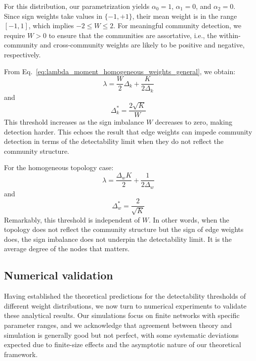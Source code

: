 \documentclass[a4paper,pre,superscriptaddress,floatfix,nofootinbib,twocolumn]{revtex4-1}
\begin{document}
For this distribution,
our parametrization yields $\alpha_0 = 1$, $\alpha_1 = 0$, and $\alpha_2 = 0$. Since sign weights take values in $\{-1, +1\}$, their mean weight
is in the range $[-1,1]$,
which implies $-2 \leq W \leq 2$. For meaningful community detection, we require $W > 0$ to ensure that the communities are assortative, i.e., the within-community and cross-community weights are likely to be positive and negative, respectively.


From Eq.~\eqref{eq:lambda_moment_homogeneous_weights_general}, we obtain:
\begin{equation}
\lambda = \frac{W}{2} \Delta_k + \frac{K}{2\Delta_k}
\label{eq:lambda_sign}
\end{equation}
and
\begin{equation}
\Delta_k^* = \frac{2\sqrt{K}}{W}
\label{eq:sign_det}
\end{equation}
This threshold increases as the sign imbalance $W$ decreases to zero, making detection harder. This echoes the result that edge weights can impede community detection  in terms of the detectability limit when they do not reflect the community structure.

For the homogeneous topology case:
\begin{equation}
\lambda = \frac{\Delta_w K}{2} + \frac{1}{2 \Delta_w}
\label{eq:lambda_sign_w}
\end{equation}
and
\begin{equation}
\Delta_{w}^* = \frac{2}{\sqrt{K}}
\label{eq:sign_w_det}
\end{equation}
Remarkably, this threshold is independent of $W$.
In other words, when the topology does not reflect the community structure but the sign of edge weights does, the sign imbalance does not underpin the detectability limit. It is the average degree of the nodes that matters.




\subsection*{Numerical validation}

Having established the theoretical predictions for the detectability thresholds of different weight distributions, we now turn to numerical experiments to validate these analytical results. Our simulations focus on finite networks with specific parameter ranges, and we acknowledge that agreement between theory and simulation is generally good but not perfect, with some systematic deviations expected due to finite-size effects and the asymptotic nature of our theoretical framework.
\end{document}
